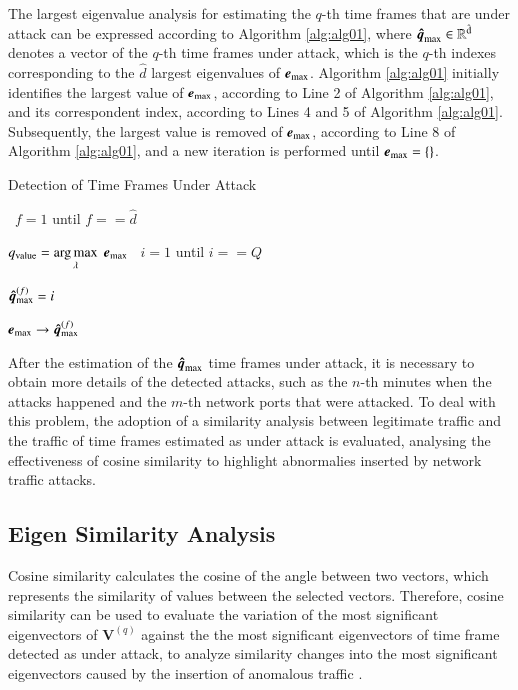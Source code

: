 \documentclass[review]{elsarticle}
\makeatletter
\DeclareMathOperator*{\argmax}{arg\,max}
\newcommand{\ALOOP}[1]{\ALC@it\algorithmicloop\ #1%
  \begin{ALC@loop}}
\newcommand{\ENDALOOP}{\end{ALC@loop}\ALC@it\algorithmicendloop}
\makeatother
\begin{document}
The largest eigenvalue analysis for estimating the $q$-th time frames that are under attack can be expressed according to Algorithm \ref{alg:alg01}, where $\rm{\boldsymbol{\hat{q}}}_{\rm max} \in \mathbb{R}^{\hat{d}}$ denotes a vector of the $q$-th time frames under attack, which is the $q$-th indexes corresponding to the $\hat{d}$ largest eigenvalues of $\boldsymbol{e}_{\rm max}$. Algorithm \ref{alg:alg01} initially identifies the largest value of $\boldsymbol{e}_{\rm max}$, according to Line 2 of Algorithm \ref{alg:alg01}, and its correspondent index, according to Lines 4 and 5 of Algorithm \ref{alg:alg01}. Subsequently, the largest value is removed of $\boldsymbol{e}_{\rm max}$, according to Line 8 of Algorithm \ref{alg:alg01}, and a new iteration is performed until $\boldsymbol{e}_{\rm max} = \{\}$.

\begin{algorithm}[h!]
	\caption{Detection of Time Frames Under Attack}
  	\label{alg:alg01}
	\begin{algorithmic}[1]
		\show\LOOP
	    \ALOOP {$f = 1$ until $f == \hat{d}$} 
	    	    \STATE $q_{\rm value} = \argmax\limits_{\lambda}  \hspace{1 mm} \boldsymbol{e}_{\rm max}$
    	    	    \ALOOP {$i = 1$ until $i == Q$} 
				    \STATE $\boldsymbol{\hat{q}}_{\rm max}^{(f)} = i$
				\ENDIF
        		\ENDALOOP
	    		\STATE $\boldsymbol{e}_{\rm max} \rightarrow \boldsymbol{\hat{q}}_{\rm max}^{(f)}$
    		\ENDALOOP
	\end{algorithmic}
\end{algorithm}

After the estimation of the $\rm{\boldsymbol{\hat{q}}}_{\rm max}$ time frames under attack, it is necessary to obtain more details of the detected attacks, such as the $n$-th minutes when the attacks happened and the $m$-th network ports that were attacked. To deal with this problem, the adoption of a similarity analysis between legitimate traffic and the traffic of time frames estimated as under attack is evaluated, analysing the effectiveness of cosine similarity to highlight abnormalies inserted by network traffic attacks. 

\subsection{Eigen Similarity Analysis}
\label{sec:prop_EigenSimilarityAnalysis}

Cosine similarity calculates the cosine of the angle between two vectors, which represents the similarity of values between the selected vectors. Therefore, cosine similarity can be used to evaluate the variation of the most significant eigenvectors of $\boldsymbol{V}^{(q)}$ against the the most significant eigenvectors of time frame detected as under attack, to analyze similarity changes into the most significant eigenvectors caused by the insertion of anomalous traffic \cite{Lee2013}. 
\end{document}
